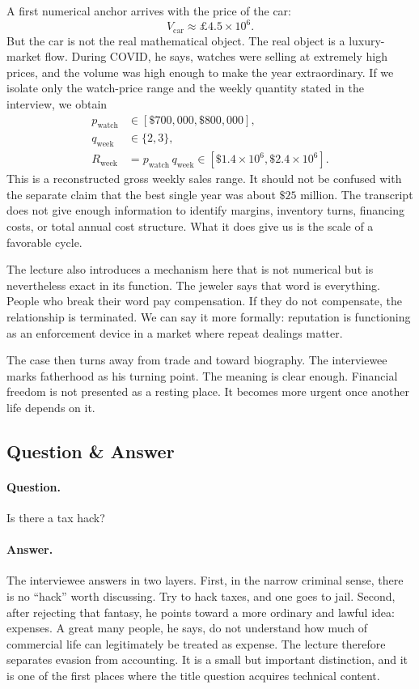 A first numerical anchor arrives with the price of the car:
\begin{equation}
V_{\mathrm{car}} \approx \pounds 4.5\times 10^{6}.
\end{equation}
But the car is not the real mathematical object. The real object is a luxury-market flow. During COVID, he says, watches were selling at extremely high prices, and the volume was high enough to make the year extraordinary. If we isolate only the watch-price range and the weekly quantity stated in the interview, we obtain
\begin{align}
p_{\mathrm{watch}} &\in [\$700{,}000,\$800{,}000],\\
q_{\mathrm{week}} &\in \{2,3\},\\
R_{\mathrm{week}} &= p_{\mathrm{watch}}\,q_{\mathrm{week}}
\in [\$1.4\times 10^6,\$2.4\times 10^6].
\end{align}
This is a reconstructed gross weekly sales range. It should not be confused with the separate claim that the best single year was about \(\$25\) million. The transcript does not give enough information to identify margins, inventory turns, financing costs, or total annual cost structure. What it does give us is the scale of a favorable cycle.

The lecture also introduces a mechanism here that is not numerical but is nevertheless exact in its function. The jeweler says that word is everything. People who break their word pay compensation. If they do not compensate, the relationship is terminated. We can say it more formally: reputation is functioning as an enforcement device in a market where repeat dealings matter.

The case then turns away from trade and toward biography. The interviewee marks fatherhood as his turning point. The meaning is clear enough. Financial freedom is not presented as a resting place. It becomes more urgent once another life depends on it.

\subsection{Question \& Answer}

\paragraph{Question.} Is there a tax hack?

\paragraph{Answer.} The interviewee answers in two layers. First, in the narrow criminal sense, there is no ``hack'' worth discussing. Try to hack taxes, and one goes to jail. Second, after rejecting that fantasy, he points toward a more ordinary and lawful idea: expenses. A great many people, he says, do not understand how much of commercial life can legitimately be treated as expense. The lecture therefore separates evasion from accounting. It is a small but important distinction, and it is one of the first places where the title question acquires technical content.

